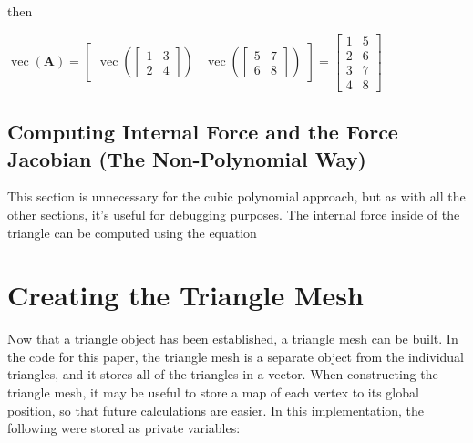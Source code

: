 \documentclass[twocolumn,10pt]{asme2ej}
\DeclareMathOperator{\vect}{vec}
\begin{document}
then

\begin{center}
$\vect (\bm{A}) = \begin{bmatrix} \vect \left(\begin{bmatrix} 1 & 3 \\ 2 & 4 \end{bmatrix}\right) & \vect \left(\begin{bmatrix} 5 & 7 \\ 6 & 8 \end{bmatrix}\right) \end{bmatrix} = \begin{bmatrix} 1 & 5 \\ 2 & 6 \\ 3 & 7 \\ 4 & 8 \end{bmatrix}$
\end{center}

\subsection{Computing Internal Force and the Force Jacobian (The Non-Polynomial Way)}

This section is unnecessary for the cubic polynomial approach, but as with all the other sections, it's useful for debugging purposes. The internal force inside of the triangle can be computed using the equation


\section{Creating the Triangle Mesh}

Now that a triangle object has been established, a triangle mesh can be built. In the code for this paper, the triangle mesh is a separate object from the individual triangles, and it stores all of the triangles in a vector. When constructing the triangle mesh, it may be useful to store a map of each vertex to its global position, so that future calculations are easier. In this implementation, the following were stored as private variables:
\end{document}
